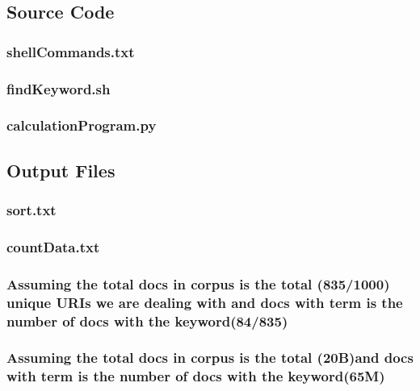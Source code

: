 \documentclass[12pt]{article}
\begin{document}
\subsection{Source Code}
\subsubsection{shellCommands.txt}


\subsubsection{findKeyword.sh}


\subsubsection{calculationProgram.py}

\newpage
\subsection{Output Files}
\subsubsection{sort.txt}


\subsubsection{countData.txt}

\newpage
\subsubsection{Assuming the total docs in corpus is the total (835/1000) unique URIs we are dealing with and docs with term is the number of docs with the keyword(84/835)}


\subsubsection{Assuming the total docs in corpus is the total (20B)and docs with term is the number of docs with the keyword(65M)}

\newpage
\end{document}
